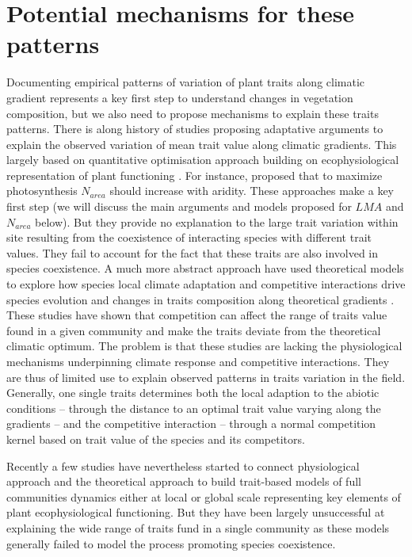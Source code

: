 \documentclass[a4paper,11pt]{article}
\begin{document}
\section{Potential mechanisms for these patterns}

Documenting empirical patterns of variation of plant traits along climatic gradient represents a key first step to understand changes in vegetation composition, but we also need to propose mechanisms to explain these traits patterns. There is along history of studies proposing adaptative arguments to explain the observed variation of mean trait value along climatic gradients. This largely based on quantitative optimisation approach building on ecophysiological representation of plant functioning \citep{Makela-2002}. For instance, \citet{Wright-2003} proposed that to maximize photosynthesis $N_{area}$ should increase with aridity. These approaches make a key first step (we will discuss the main arguments and models proposed for $LMA$ and $N_{area}$ below). But they provide no explanation to the large trait variation within site resulting from the coexistence of interacting species with different trait values. They fail to account for the fact that these traits are also involved in species coexistence. A much more abstract approach have used theoretical models to explore how species local climate adaptation and competitive interactions drive species evolution and changes in traits composition along theoretical gradients \citep{Case-2000,Doebeli-2003,Goldberg-2006,Leimar-2008}. These studies have shown that competition can affect the range of traits value found in a given community and make the traits deviate from the theoretical climatic optimum. The problem is that these studies are lacking the physiological mechanisms underpinning climate response and competitive interactions. They are thus of limited use to explain observed patterns in traits variation in the field. Generally, one single traits determines both the local adaption to the abiotic conditions -- through the distance to an optimal trait value varying along the gradients -- and the competitive interaction -- through a normal competition kernel based on trait value of the species and its competitors\citep[see][]{Case-2000}.  

Recently a few studies have nevertheless started to connect physiological approach and the theoretical approach to build trait-based models of full communities dynamics either at local \citep{Farrior-2013} or global scale \citep[see][]{Sakschewski-2015,Scheiter-2013} representing key elements of plant ecophysiological functioning. But they have been largely unsuccessful at explaining the wide range of traits fund in a single community as these models generally failed to model the process promoting species coexistence.
\end{document}
